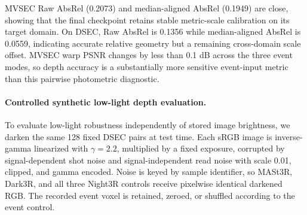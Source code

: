 MVSEC Raw AbsRel (0.2073) and median-aligned AbsRel (0.1949) are close, showing
that the final checkpoint retains stable metric-scale calibration on its target
domain.  On DSEC, Raw AbsRel is 0.1356 while median-aligned AbsRel is 0.0559,
indicating accurate relative geometry but a remaining cross-domain scale
offset.  MVSEC warp PSNR changes by less than 0.1 dB across the three event
modes, so depth accuracy is a substantially more sensitive event-input metric
than this pairwise photometric diagnostic.

\paragraph{Controlled synthetic low-light depth evaluation.}
To evaluate low-light robustness independently of stored image brightness, we
darken the same 128 fixed DSEC pairs at test time.  Each sRGB image is
inverse-gamma linearized with $\gamma=2.2$, multiplied by a fixed exposure,
corrupted by signal-dependent shot noise and signal-independent read noise with
scale 0.01, clipped, and gamma encoded.  Noise is keyed by sample identifier,
so MASt3R, Dark3R, and all three Night3R controls receive pixelwise identical
darkened RGB.  The recorded event voxel is retained, zeroed, or shuffled
according to the event control.


